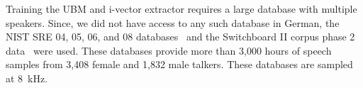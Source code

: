Training the UBM and i-vector extractor requires a large database with multiple speakers. Since, we did not have access to any such database in German,
the NIST SRE 04, 05, 06, and 08 databases~\cite{alvin2004nist,przybocki2006nist,martin2009nist} and the Switchboard II corpus phase 2 data~\cite{graff1999switchboard} were used. These databases provide more than 3,000 hours of speech samples from 3,408 female and 1,832 male talkers. These databases are sampled at 8~kHz. %

